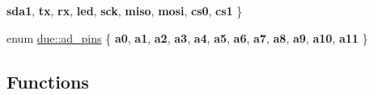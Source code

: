 \begin{DoxyCompactItemize}
{\bfseries sda1}, 
{\bfseries tx}, 
{\bfseries rx}, 
\newline
{\bfseries led}, 
{\bfseries sck}, 
{\bfseries miso}, 
{\bfseries mosi}, 
\newline
{\bfseries cs0}, 
{\bfseries cs1}
 \}
\item 
enum \hyperlink{namespacedue_a5ecc98d40585c91eabbfb14f71bd7d4c}{due\+::ad\+\_\+pins} \{ \newline
{\bfseries a0}, 
{\bfseries a1}, 
{\bfseries a2}, 
{\bfseries a3}, 
\newline
{\bfseries a4}, 
{\bfseries a5}, 
{\bfseries a6}, 
{\bfseries a7}, 
\newline
{\bfseries a8}, 
{\bfseries a9}, 
{\bfseries a10}, 
{\bfseries a11}
 \}
\end{DoxyCompactItemize}
\subsection*{Functions}
